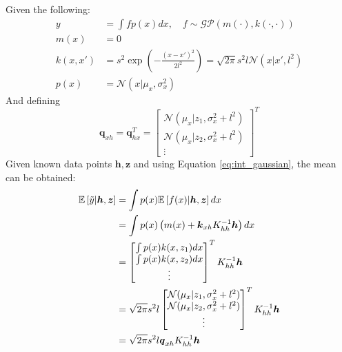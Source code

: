 \documentclass{article}
\begin{document}
Given the following:
\begin{equation}
    \begin{aligned}
        y&=\int fp(x)dx, \quad f\sim\mathcal{GP}(m(\cdot), k(\cdot, \cdot)) \\
        m(x)&=0 \\
        k(x,x')&=s^2 \exp(-\frac{(x-x')^2}{2l^2})=\sqrt{2\pi}s^2l\mathcal{N}(x|x',l^2) \\
        p(x)&=\mathcal{N}(x|\mu_x,\sigma_x^2)
    \end{aligned}
\end{equation}
And defining
\begin{equation}
    \boldsymbol{q}_{xh}=\boldsymbol{q}_{hx}^T=\begin{bmatrix}
        \mathcal{N}(\mu_x|z_1,\sigma_x^2+l^2) \\
        \mathcal{N}(\mu_x|z_2,\sigma_x^2+l^2) \\
        \vdots
    \end{bmatrix}^T
\end{equation}
Given known data points $\boldsymbol{h}, \boldsymbol{z}$ and using Equation \ref{eq:int_gaussian}, the mean can be obtained:
\begin{equation}
    \begin{aligned}
        \mathbb{E}\left[\Tilde{y}|\boldsymbol{h},\boldsymbol{z}\right]&=\int p(x)\mathbb{E}\left[f(x)|\boldsymbol{h},\boldsymbol{z}\right]dx \\
        &=\int p(x)\left(m(x)+\boldsymbol{k}_{xh}K_{hh}^{-1}\boldsymbol{h}\right)dx \\
        &=\begin{bmatrix}
            \int p(x)k(x,z_1)dx \\
            \int p(x)k(x,z_2)dx \\
            \vdots
        \end{bmatrix}^T K_{hh}^{-1}\boldsymbol{h} \\
        &=\sqrt{2\pi}s^2l\begin{bmatrix}
            \mathcal{N}(\mu_x|z_1,\sigma_x^2+l^2) \\
            \mathcal{N}(\mu_x|z_2,\sigma_x^2+l^2) \\
            \vdots
        \end{bmatrix}^TK_{hh}^{-1}\boldsymbol{h} \\
        &=\sqrt{2\pi}s^2l\boldsymbol{q}_{xh}K_{hh}^{-1}\boldsymbol{h}
    \end{aligned}
\end{equation}
\end{document}
